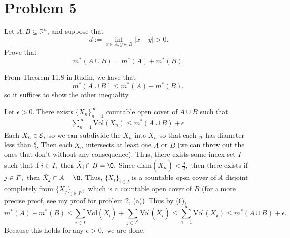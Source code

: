 \documentclass[11pt]{article}
\newcommand{\Vol}{\text{Vol}}
\renewcommand{\emptyset}{\O}
\begin{document}
\section*{Problem 5}
\begin{problem}
    Let $A, B \subseteq \mathbb{R}^n$, and suppose that
\[
d := \inf_{x \in A, y \in B} |x - y| > 0.
\]
Prove that
\[
m^*(A \cup B) = m^*(A) + m^*(B).
\]
\end{problem}
\begin{solution}
    From Theorem 11.8 in Rudin, we have that 
    \[m^*(A \cup B) \leq m^*(A) + m^*(B),\] so it suffices to show the other inequality.

    Let $\epsilon>0.$ There exists $\{X_n\}_{n=1}^\infty$ countable open cover of $A\cup B$ such that
    \begin{align}
    \sum_{n=1}^\infty \Vol(X_n) \leq m^*(A \cup B) + \epsilon.    
    \end{align}
    Each $X_n \in \cal E,$ so we can subdivide the $X_n$ into $\tilde{X}_n$ so that each $\title{X}_n$ has diameter less than $\frac{d}{2}.$ Then each $\tilde{X}_n$ intersects at least one $A$ or $B$ (we can throw out the ones that don't without any consequence). Thus, there exists some index set $I$ such that if $i \in I,$ then $\tilde{X}_i \cap B = \emptyset.$ Since $\text{diam}(\tilde{X}_n) <\frac{d}{2},$ then  there exists if $j \in I^c,$ then $\tilde{X}_j \cap A = \emptyset.$ Thus, $\{\tilde{X}_i\}_{i \in I}$ is a countable open cover of $A$ disjoint completely from $\{\tilde{X}_j\}_{j \in I^c},$ which is a countable open cover of $B$ (for a more precise proof, see my proof for problem 2, (a)). Thus by (6), 
    \[m^*(A) + m^*(B) \leq \sum_{i \in I} \Vol(\tilde{X}_i) + \sum_{j \in I^c} \Vol(\tilde{X}_i) \leq \sum_{n=1}^\infty \Vol(X_n) \leq m^*(A \cup B) + \epsilon.\] Because this holds for any $\epsilon>0,$ we are done.
\end{solution}

\newpage
\end{document}
